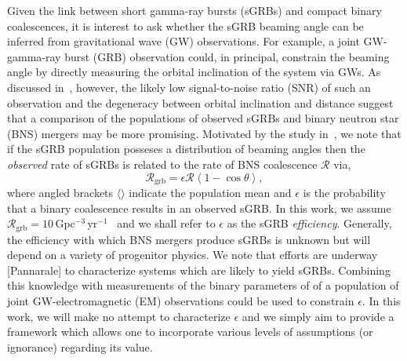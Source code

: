 \documentclass[twocolumn,nofootinbib]{revtex4-1}
\newcommand{\grbrate}{{{\mathcal R}_{\mathrm{grb}}}}
\newcommand{\cbcrate}{{{\mathcal R}}}
\def\bns#1{binary neutron star#1 (BNS#1)\gdef\bns{BNS}}
\def\gw#1{gravitational wave#1 (GW#1)\gdef\gw{GW}}
\def\grb#1{gamma-ray burst#1 (GRB#1)\gdef\grb{GRB}}
\def\sgrb#1{short gamma-ray burst#1 (sGRB#1)\gdef\sgrb{sGRB}}
\def\electro#1{electromagnetic#1 (EM#1)\gdef\electro{EM}}
\def\snr#1{signal-to-noise ratio#1 (SNR#1)\gdef\snr{SNR}}
\begin{document}
Given the link between \sgrb{s} and compact binary coalescences, it is interest
to ask whether the \sgrb{} beaming angle can be inferred from \gw{}
observations.  For example, a joint \gw{}-\grb{} observation could, in
principal, constrain the beaming angle by directly measuring the orbital
inclination of the system via \gw{s}.  As discussed
in~\cite{0004-637X-809-1-53}, however, the likely low \snr{} of such an
observation and the degeneracy between orbital inclination and distance suggest
that a comparison of the populations of observed \sgrb{s} and \bns{} mergers may
be more promising.   Motivated by the study in~\cite{2013PhRvL.111r1101C}, we
note that if the \sgrb{} population posseses a distribution of beaming angles
then the \emph{observed} rate of \sgrb{s} is related to the rate of \bns{}
coalescence $\cbcrate$ via,
%
\begin{equation}\label{eq:rate2angle}
    \grbrate = \epsilon\cbcrate \left \langle 1-\cos \theta \right \rangle,
\end{equation}
%
where angled brackets $\langle \rangle$ indicate the population mean and
$\epsilon$ is the probability that a binary coalescence results in an observed
\sgrb{}.  In this work, we assume
$\grbrate=10$\,Gpc$^{-3}$\,yr$^{-1}$~\cite{nakar-2007,Dietz11} and we shall
refer to $\epsilon$ as the \sgrb{} \emph{efficiency}.  Generally, the efficiency
with which \bns{} mergers produce \sgrb{s} is unknown but will depend on a
variety of progenitor physics.  We note that efforts are underway [Pannarale] to
characterize systems which are likely to yield \sgrb{s}.  Combining this
knowledge with measurements of the binary parameters of of a population of joint
\gw{}-\electro{} observations could be used to constrain $\epsilon$.  In this
work, we will make no attempt to characterize $\epsilon$ and we simply aim to
provide a framework which allows one to incorporate various levels of
assumptions (or ignorance) regarding its value.   
\end{document}
